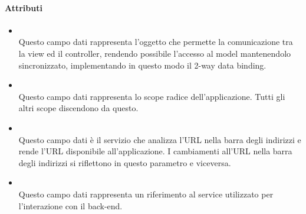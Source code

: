 \paragraph*{Attributi}
\begin{itemize}
\item[]  \\ Questo campo dati rappresenta l'oggetto che permette la comunicazione tra la view ed il controller, rendendo possibile l’accesso al model mantenendolo sincronizzato,  implementando in questo modo il 2-way data binding.
\item[]  \\ Questo campo dati rappresenta lo scope radice dell'applicazione. Tutti gli altri scope discendono da questo.
\item[]  \\ Questo campo dati è il servizio che analizza l'URL nella barra degli indirizzi e rende l'URL disponibile all'applicazione. I cambiamenti all'URL nella barra degli indirizzi si riflettono in questo parametro e viceversa.
\item[]  \\ Questo campo dati rappresenta un riferimento al service utilizzato per l'interazione con il back-end.
\end{itemize}

